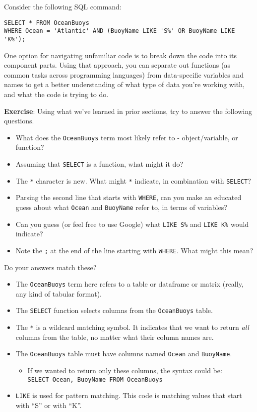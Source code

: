 \documentclass[
]{book}
\providecommand{\tightlist}{%
  \setlength{\itemsep}{0pt}\setlength{\parskip}{0pt}}
\begin{document}
Consider the following SQL command:

\begin{verbatim}
SELECT * FROM OceanBuoys
WHERE Ocean = 'Atlantic' AND (BuoyName LIKE 'S%' OR BuoyName LIKE 'K%');
\end{verbatim}

One option for navigating unfamiliar code is to break down the code into its component parts. Using that approach, you can separate out functions (as common tasks across programming languages) from data-specific variables and names to get a better understanding of what type of data you're working with, and what the code is trying to do.

\textbf{Exercise}: Using what we've learned in prior sections, try to answer the following questions.

\begin{itemize}
\tightlist
\item
  What does the \texttt{OceanBuoys} term most likely refer to - object/variable, or function?
\item
  Assuming that \texttt{SELECT} is a function, what might it do?
\item
  The \texttt{*} character is new. What might \texttt{*} indicate, in combination with \texttt{SELECT}?
\item
  Parsing the second line that starts with \texttt{WHERE}, can you make an educated guess about what \texttt{Ocean} and \texttt{BuoyName} refer to, in terms of variables?
\item
  Can you guess (or feel free to use Google) what \texttt{LIKE\ \textquotesingle{}S\%\textquotesingle{}} and \texttt{LIKE\ \textquotesingle{}K\%\textquotesingle{}} would indicate?
\item
  Note the \texttt{;} at the end of the line starting with \texttt{WHERE}. What might this mean?
\end{itemize}

Do your answers match these?

\begin{itemize}
\tightlist
\item
  The \texttt{OceanBuoys} term here refers to a table or dataframe or matrix (really, any kind of tabular format).
\item
  The \texttt{SELECT} function selects columns from the \texttt{OceanBuoys} table.
\item
  The \texttt{*} is a wildcard matching symbol. It indicates that we want to return \emph{all} columns from the table, no matter what their column names are.
\item
  The \texttt{OceanBuoys} table must have columns named \texttt{Ocean} and \texttt{BuoyName}.

  \begin{itemize}
  \tightlist
  \item
    If we wanted to return only these columns, the syntax could be: \texttt{SELECT\ Ocean,\ BuoyName\ FROM\ OceanBuoys}
  \end{itemize}
\item
  \texttt{LIKE} is used for pattern matching. This code is matching values that start with ``S'' or with ``K''.
\end{itemize}
\end{document}
